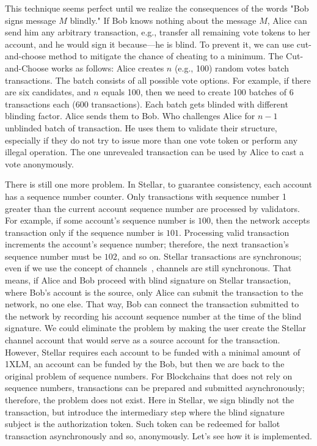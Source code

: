 \documentclass[applsci,article,submit,moreauthors,pdftex]{Definitions/mdpi}
\begin{document}
This technique seems perfect until we realize the consequences of the words "Bob signs message $M$ blindly." If Bob knows nothing about the message $M$, Alice can send him any arbitrary transaction, e.g., transfer all remaining vote tokens to her account, and he would sign it because––he is blind. To prevent it, we can use cut-and-choose method to mitigate the chance of cheating to a minimum.
The Cut-and-Choose works as follows: Alice creates $n$ (e.g., 100) random votes batch transactions. The batch consists of all possible vote options. For example, if there are six candidates, and $n$ equals 100, then we need to create 100 batches of 6 transactions each (600 transactions). Each batch gets blinded with different blinding factor. Alice sends them to Bob. Who challenges Alice for \(n-1\) unblinded batch of transaction. He uses them to validate their structure, especially if they do not try to issue more than one vote token or perform any illegal operation. The one unrevealed transaction can be used by Alice to cast a vote anonymously.


There is still one more problem. In Stellar, to guarantee consistency, each account has a sequence number counter. Only transactions with sequence number 1 greater than the current account sequence number are processed by validators. For example, if some account's sequence number is $100$, then the network accepts transaction only if the sequence number is $101$. Processing valid transaction increments the account's sequence number; therefore, the next transaction's sequence number must be $102$, and so on. Stellar transactions are synchronous; even if we use the concept of channels~\cite{Channels80:online}, channels are still synchronous. That means, if Alice and Bob proceed with blind signature on Stellar transaction, where Bob's account is the source, only Alice can submit the transaction to the network, no one else. That way, Bob can connect the transaction submitted to the network by recording his account sequence number at the time of the blind signature. We could eliminate the problem by making the user create the Stellar channel account that would serve as a source account for the transaction. However, Stellar requires each account to be funded with a minimal amount of 1XLM, an account can be funded by the Bob, but then we are back to the original problem of sequence numbers. For Blockchains that does not rely on sequence numbers, transactions can be prepared and submitted asynchronously; therefore, the problem does not exist. Here in Stellar, we sign blindly not the transaction, but introduce the intermediary step where the blind signature subject is the authorization token. Such token can be redeemed for ballot transaction asynchronously and so, anonymously. Let's see how it is implemented. 
\end{document}
